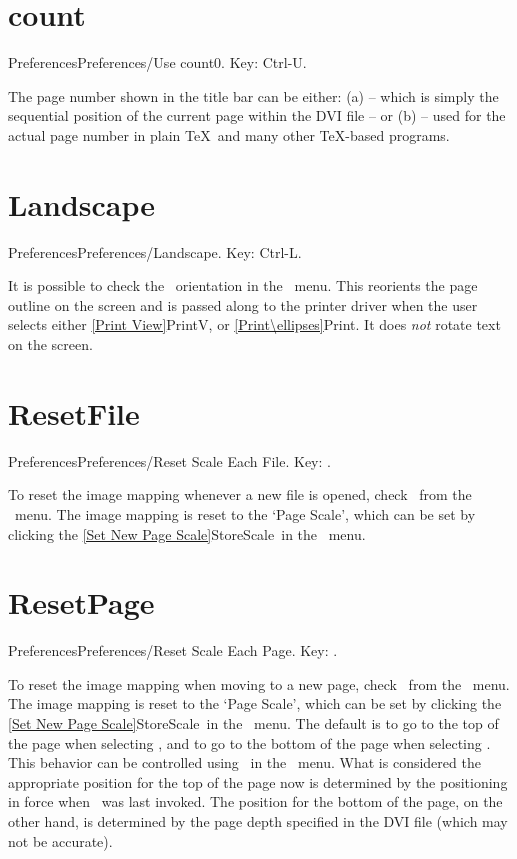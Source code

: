 \section{count}{Preferences}Preferences/Use count0. Key: Ctrl-U.

The page number shown in the  %
title bar can be either: (a)
 -- which is simply the sequential position of the current
page within the DVI file -- or (b)  -- used for the actual page
number in plain \TeX\ and many other \TeX-based programs.
   \bigskip

   
\section{Landscape}{Preferences}Preferences/Landscape.  Key: Ctrl-L.

It is possible to check the \ orientation in the
\ menu.  This reorients the page outline on the screen
and is passed along to the printer driver when the user selects either
\ref{Print View}{PrintV}, or \ref{Print\ellipses}{Print}.
It does {\it not\/} rotate text on the screen. 
   \bigskip

\newpage

\section{ResetFile}{Preferences}Preferences/Reset Scale Each File.
   Key: \none.

To reset the image mapping whenever a new file is opened, check \ from the \ menu.  The image mapping is
reset to the `Page Scale', which can be set by clicking the
\ref{Set New Page Scale}{StoreScale}\ in the \ menu.
   \bigskip

   
\section{ResetPage}{Preferences}Preferences/Reset Scale Each Page.
   Key: \none.

To reset the image mapping when moving to a new page, check \ from the \ menu.  The image mapping is reset to
the `Page Scale', which can be set by clicking the
\ref{Set New Page Scale}{StoreScale}\ in the \ menu.
   \bigskip
The default is to go to the top of the page when selecting ,
and to go to the bottom of the page when selecting .  This
behavior can be controlled using \ in the
\ menu.  What is considered the appropriate position for
the top of the page now is determined by the positioning in force when
\ was last invoked.  The position for the bottom of
the page, on the other hand, is determined by the page depth specified in
the DVI file (which may not be accurate).
   \bigskip

